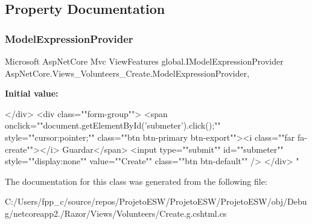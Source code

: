 \subsection{Property Documentation}
\mbox{\label{class_asp_net_core_1_1_views___volunteers___create_aefba05920c829283aea61f2ff9872a54}} 
\subsubsection{\texorpdfstring{Model\+Expression\+Provider}{ModelExpressionProvider}}
{\footnotesize\ttfamily Microsoft Asp\+Net\+Core Mvc View\+Features global.\+I\+Model\+Expression\+Provider Asp\+Net\+Core.\+Views\+\_\+\+Volunteers\+\_\+\+Create.\+Model\+Expression\+Provider\hspace{0.3cm}{\ttfamily [get]}, {}}

{\bfseries Initial value\+:}
\begin{DoxyCode}

            </div>
            <div \textcolor{keyword}{class}=\textcolor{stringliteral}{""}form-group\textcolor{stringliteral}{""}>
                <span onclick=\textcolor{stringliteral}{""}document.getElementById(\textcolor{stringliteral}{'submeter'}).click();\textcolor{stringliteral}{""} style=\textcolor{stringliteral}{""}cursor:pointer;\textcolor{stringliteral}{""} \textcolor{keyword}{
      class}=\textcolor{stringliteral}{""}btn btn-primary btn-export\textcolor{stringliteral}{""}><i \textcolor{keyword}{class}=\textcolor{stringliteral}{""}far fa-create\textcolor{stringliteral}{""}></i> Guardar</span>
                <input type=\textcolor{stringliteral}{""}submit\textcolor{stringliteral}{""} \textcolor{keywordtype}{id}=\textcolor{stringliteral}{""}submeter\textcolor{stringliteral}{""} style=\textcolor{stringliteral}{""}display:none\textcolor{stringliteral}{""} value=\textcolor{stringliteral}{""}Create\textcolor{stringliteral}{""} \textcolor{keyword}{class}=\textcolor{stringliteral}{""}btn 
      btn-\textcolor{keywordflow}{default}\textcolor{stringliteral}{""} />
            </div>
        \textcolor{stringliteral}{"}
\end{DoxyCode}


The documentation for this class was generated from the following file\+:\begin{DoxyCompactItemize}
\item 
C\+:/\+Users/fpp\+\_\+c/source/repos/\+Projeto\+E\+S\+W/\+Projeto\+E\+S\+W/\+Projeto\+E\+S\+W/obj/\+Debug/netcoreapp2./\+Razor/\+Views/\+Volunteers/Create.\+g.\+cshtml.\+cs\end{DoxyCompactItemize}
